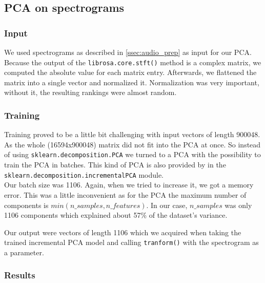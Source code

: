 \subsection {PCA on spectrograms}

\subsubsection{Input}
We used spectrograms as described in \ref{ssec:audio_prep} as input for our PCA. Because the output of the \texttt{librosa.core.stft()} method is a complex matrix, we computed the absolute value for each matrix entry. Afterwards, we flattened the matrix into a single vector and normalized it. Normalization was very important, without it, the resulting rankings were almost random.

\subsubsection{Training}
Training proved to be a little bit challenging with input vectors of length 900048. As the whole (16594x900048) matrix did not fit into the PCA at once. So instead of using \texttt{sklearn.decomposition.PCA} we turned to a PCA with the possibility to train the PCA in batches. This kind of PCA is also provided by  in the \texttt{sklearn.decomposition.incrementalPCA} module. \\ Our batch size was 1106. Again, when we tried to increase it, we got a memory error. This was a little inconvenient as for the PCA the maximum number of components is $min(n\_samples, n\_features)$. In our case, $n\_samples$ was only 1106 components which explained about 57\% of the dataset's variance.

Our output were vectors of length 1106 which we acquired when taking the trained incremental PCA model and calling \texttt{tranform()} with the spectrogram as a parameter.

\subsubsection{Results}

